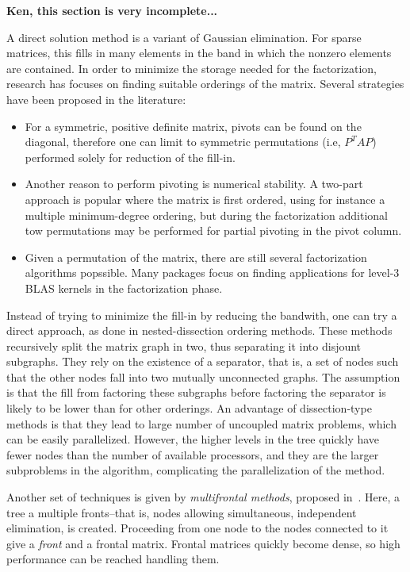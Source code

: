 \documentclass[acmtocl]{acmtrans2m}
\begin{document}
{\bf Ken, this section is very incomplete...}

\bigskip

A direct solution method is a variant of Gaussian elimination. For sparse
matrices, this fills in many elements in the band in which the nonzero
elements are contained. In order to minimize the storage needed for the
factorization, research has focuses on finding suitable orderings of the
matrix. Several strategies have been proposed in the literature:
\begin{itemize}
\item For a symmetric, positive definite matrix, pivots can be found on the
diagonal, therefore one can limit to symmetric permutations (i.e, $P^T A P$)
  performed solely for reduction of the fill-in.
\item Another reason to perform pivoting is numerical stability. A two-part
approach is popular where the matrix is first ordered, using for instance a
multiple minimum-degree ordering, but during the factorization additional tow
permutations may be performed for partial pivoting in the pivot column.
\item Given a permutation of the matrix, there are still several factorization
algorithms popssible. Many packages focus on finding applications for level-3
BLAS kernels in the factorization phase.
\end{itemize}
Instead of trying to minimize the fill-in by reducing the bandwith, one can
try a direct approach, as done in nested-dissection ordering methods. These
methods recursively split the matrix graph in two, thus separating it into
disjount subgraphs. They rely on the existence of a separator, that is, a set
of nodes such that the other nodes fall into two mutually unconnected graphs.
The assumption is that the fill from factoring these subgraphs before
factoring the separator is likely to be lower than for other orderings. An
advantage of dissection-type methods is that they lead to large number of
uncoupled matrix problems, which can be easily parallelized. However, the
higher levels in the tree quickly have fewer nodes than the number of
available processors, and they are the larger subproblems  in the algorithm,
  complicating the parallelization of the method.

Another set of techniques is given by {\sl multifrontal methods}, proposed
in~\cite{duff83multifrontal}. Here, a tree a multiple fronts--that is, nodes
allowing simultaneous, independent elimination, is created. Proceeding from
one node to the nodes connected to it give a {\sl front} and a frontal matrix.
Frontal matrices quickly become dense, so high performance can be reached
handling them.
\end{document}
